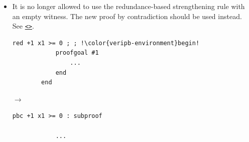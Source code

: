\documentclass[a4paper]{article}
\newcommand{\lnkBNF}[1]{\hyperlink{def:#1}{<\detokenize{#1}>}}
\newcommand{\veriPB}[0]{\textsc{VeriPB}}
\begin{document}
\begin{itemize}
\begin{minipage}{.47\linewidth}
\begin{lstlisting}[language=veripb, gobble=8, rulecolor=\color{veripb-invalid-text}, caption={\veriPB{} 2.0 syntax.}]
		red +1 ~r1 +1 x1 >= 1 ; r1 -> 0 ; !\color{veripb-environment}begin!
			proofgoal #1
				...
			end
		end
		\end{lstlisting}
	      \end{minipage}\hfill%
	      \begin{minipage}[t]{.05\linewidth}
		      \centering \vspace*{-5mm}$\to$
	      \end{minipage}\hfill%
	      \hfill%
	      \begin{minipage}{.47\linewidth}
		      \begin{lstlisting}[language=veripb, gobble=8, rulecolor=\color{veripb-valid-text}, caption={\veriPB{} 3.0 syntax.}]
		red +1 ~r1 +1 x1 >= 1 : r1 -> 0 : subproof
			proofgoal #1
				...
			qed;
		qed;
		\end{lstlisting}
	      \end{minipage}
	\item It is no longer allowed to use the redundance-based strengthening rule with an empty witness. The new proof by contradiction should be used instead. See \texttt{\lnkBNF{pbc_rule}}.
	      \\[1mm]
	      \begin{minipage}{.47\linewidth}
		      \begin{lstlisting}[language=veripb, gobble=8, rulecolor=\color{veripb-invalid-text}, caption={\veriPB{} 2.0 syntax.}]
		red +1 x1 >= 0 ; ; !\color{veripb-environment}begin!
			proofgoal #1
				...
			end
		end
		\end{lstlisting}
	      \end{minipage}\hfill%
	      \begin{minipage}[t]{.05\linewidth}
		      \centering \vspace*{-5mm}$\to$
	      \end{minipage}\hfill%
	      \hfill%
	      \begin{minipage}{.47\linewidth}
		      \begin{lstlisting}[language=veripb, gobble=8, rulecolor=\color{veripb-valid-text}, caption={\veriPB{} 3.0 syntax.}]
		pbc +1 x1 >= 0 : subproof

			...


\end{lstlisting}
\end{minipage}
\end{itemize}
\end{document}
